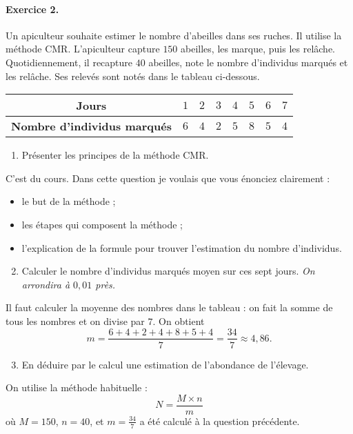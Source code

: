 \documentclass[11pt]{article}
\begin{document}
\paragraph{Exercice 2.} Un apiculteur souhaite estimer le nombre d'abeilles dans
ses ruches. Il utilise la méthode CMR. L'apiculteur capture $150$ abeilles, les
marque, puis les rel\^ache. Quotidiennement, il recapture $40$ abeilles, note le
nombre d'individus marqués et les rel\^ache. Ses relevés sont notés dans le
tableau ci-dessous.
\begin{center}
  \renewcommand{\arraystretch}{1.2}
  \begin{tabular}[]{|c|c|c|c|c|c|c|c|}
    \hline
    \textbf{Jours} & $1$ & $2$ & $3$ & $4$ & $5$ & $6$ & $7$ \\
    \hline
    \textbf{Nombre d'individus marqués} & $6$ & $4$ & $2$ & $5$ & $8$ & $5$ &
    $4$ \\
    \hline
  \end{tabular}
\end{center}
\begin{enumerate}
  \item Présenter les principes de la méthode CMR.
\end{enumerate}
C'est du cours. Dans cette question je voulais que vous énonciez clairement : 
\begin{itemize}
  \item le but de la méthode ;
  \item les étapes qui composent la m\'ethode ;
  \item l'explication de la formule pour trouver l'estimation du nombre
    d'individus.
\end{itemize}
\begin{enumerate}
    \setcounter{enumi}{1}
  \item Calculer le nombre d'individus marqués moyen sur ces sept jours.
    \emph{On arrondira à $0,01$ près.}
\end{enumerate}
Il faut calculer la moyenne des nombres dans le tableau : on fait la somme de
tous les nombres et on divise par $7$. On obtient
\[
  m=\frac{6+4+2+4+8+5+4}{7}=\frac{34}{7}\approx4,86.
\]
\begin{enumerate}
    \setcounter{enumi}{2}
  \item En déduire par le calcul une estimation de l'abondance de l'élevage.
\end{enumerate}
On utilise la méthode habituelle :
\[
  N = \frac{M\times n}{m}
\]
où $M=150$, $n=40$, et $m=\frac{34}{7}$ a été calculé à la question précédente.
\end{document}
